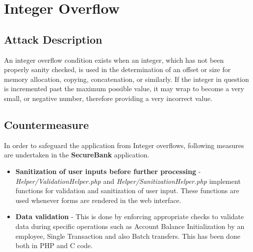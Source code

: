\section{Integer Overflow}

\subsection{Attack Description}
An integer overflow condition exists when an integer, which has not been properly sanity checked, is used in the determination of an offset or size for memory allocation, copying, concatenation, or similarly. If the integer in question is incremented past the maximum possible value, it may wrap to become a very small, or negative number, therefore providing a very incorrect value.

\subsection{Countermeasure}
In order to safeguard the application from Integer overflows, following measures are undertaken in the \textbf{SecureBank} application.
\begin{itemize}
\item \textbf{Sanitization of user inputs before further processing} -  \textit{Helper/ValidationHelper.php} and \textit{Helper/SanitizationHelper.php} implement functions for validation and sanitization of user input. These functions are used whenever forms are rendered in the web interface.
\item \textbf{Data validation} - This is done by enforcing appropriate checks to validate data during specific operations such as Account Balance Initialization by an employee, Single Transaction and also Batch transfers. This has been done both in PHP and C code.
\end{itemize}

\clearpage